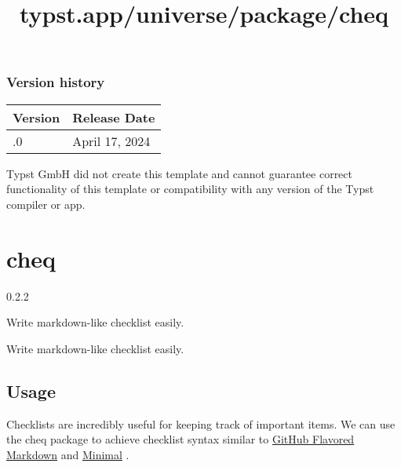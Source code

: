 \label{versions}
\subsubsection{Version history}\label{version-history}

\begin{longtable}[]{@{}ll@{}}
\toprule\noalign{}
Version & Release Date \\
\midrule\noalign{}
\endhead
\bottomrule\noalign{}
\endlastfoot
0.1.0 & April 17, 2024 \\
\end{longtable}

Typst GmbH did not create this template and cannot guarantee correct
functionality of this template or compatibility with any version of the
Typst compiler or app.


\title{typst.app/universe/package/cheq}

\label{banner}
\section{cheq}\label{cheq}

{ 0.2.2 }

Write markdown-like checklist easily.

\label{readme}
Write markdown-like checklist easily.

\subsection{Usage}\label{usage}

Checklists are incredibly useful for keeping track of important items.
We can use the cheq package to achieve checklist syntax similar to
\href{https://github.github.com/gfm/\#task-list-items-extension-}{GitHub
Flavored Markdown} and \href{https://minimal.guide/checklists}{Minimal}
.

